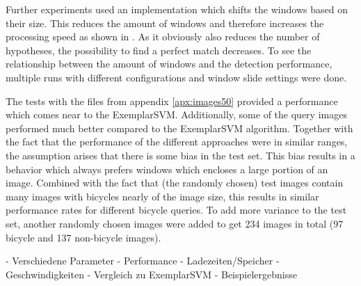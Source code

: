 Further experiments used an implementation which shifts the windows based on their size. This reduces the amount of windows and therefore increases the processing speed as shown in .
As it obviously also reduces the number of hypotheses, the possibility to find a perfect match decreases. To see the relationship between the amount of windows and the detection performance, multiple runs with different configurations and window slide settings were done.

The tests with the files from appendix \ref{apx:images50} provided a performance which comes near to the ExemplarSVM. Additionally, some of the query images performed much better compared to the ExemplarSVM algorithm. Together with the fact that the performance of the different approaches were in similar ranges, the assumption arises that there is some bias in the test set. This bias results in a behavior which always prefers windows which encloses a large portion of an image. Combined with the fact that (the randomly chosen) test images contain many images with bicycles nearly of the image size, this results in similar performance rates for different bicycle queries. To add more variance to the test set, another randomly chosen images were added to get 234 images in total (97 bicycle and 137 non-bicycle images).

- Verschiedene Parameter
- Performance
- Ladezeiten/Speicher
- Geschwindigkeiten
- Vergleich zu ExemplarSVM
- Beispielergebnisse
